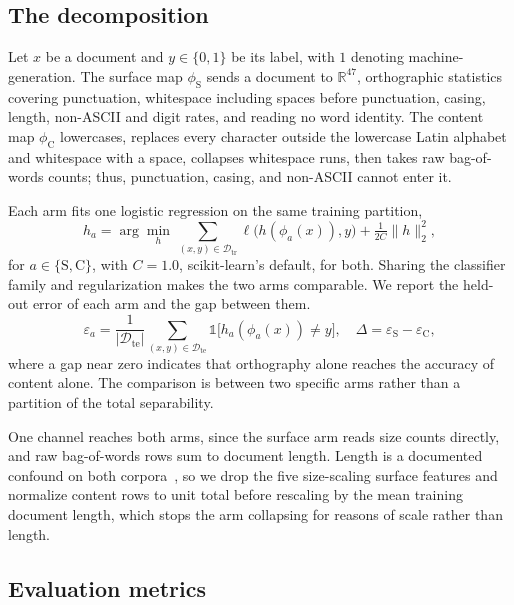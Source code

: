 \documentclass[conference,a4paper]{IEEEtran}
\begin{document}
\subsection{The decomposition}
\label{sec:decomp-def}

Let $x$ be a document and $y \in \{0,1\}$ be its label, with $1$ denoting machine-generation. The surface map $\phi_{\mathrm{S}}$ sends a document to $\mathbb{R}^{47}$, orthographic statistics covering punctuation, whitespace including spaces before punctuation, casing, length, non-ASCII and digit rates, and reading no word identity. The content map $\phi_{\mathrm{C}}$ lowercases, replaces every character outside the lowercase Latin alphabet and whitespace with a space, collapses whitespace runs, then takes raw bag-of-words counts; thus, punctuation, casing, and non-ASCII cannot enter it.

Each arm fits one logistic regression on the same training partition,
\begin{equation}
\label{eq:arm}
h_{a} = \arg\min_{h} \, \sum_{(x,y) \in \mathcal{D}_{\text{tr}}} \ell\big(h(\phi_{a}(x)), y\big) + \tfrac{1}{2C}\lVert h \rVert_2^2 ,
\end{equation}
for $a \in \{\mathrm{S},\mathrm{C}\}$, with $C=1.0$, scikit-learn's default, for both. Sharing the classifier family and regularization makes the two arms comparable. We report the held-out error of each arm and the gap between them.
\begin{equation}
\label{eq:gap}
\varepsilon_{a} = \frac{1}{|\mathcal{D}_{\text{te}}|}\!\!\sum_{(x,y) \in \mathcal{D}_{\text{te}}}\!\!\mathbb{1}\big[h_{a}(\phi_{a}(x)) \neq y\big],
\quad
\Delta = \varepsilon_{\mathrm{S}} - \varepsilon_{\mathrm{C}},
\end{equation}
where a gap near zero indicates that orthography alone reaches the accuracy of content alone. The comparison is between two specific arms rather than a partition of the total separability.

One channel reaches both arms, since the surface arm reads size counts directly, and raw bag-of-words rows sum to document length. Length is a documented confound on both corpora~\cite{Baidya2026detecting}, so we drop the five size-scaling surface features and normalize content rows to unit total before rescaling by the mean training document length, which stops the arm collapsing for reasons of scale rather than length.

\subsection{Evaluation metrics}
\label{sec:metrics}
\end{document}
